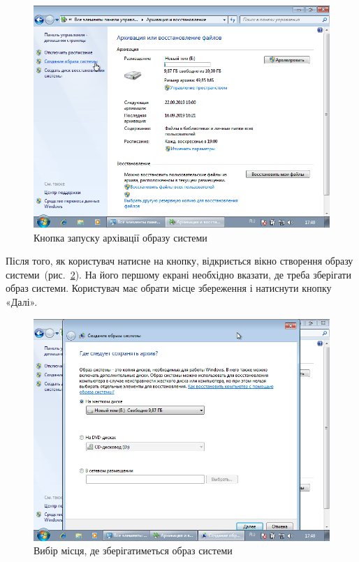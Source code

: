 \documentclass[
	a4paper,
	oneside,
	BCOR = 10mm,
	DIV = 12,
	12pt,
	headings = normal,
]{scrartcl}
\begin{document}
				\begin{figure}[!htbp]
					\centering
					\includegraphics[height=11\baselineskip]{./assets/y04s01-infosec-lab-01-03-p07.png}
					\caption{Кнопка запуску архівації образу системи}
					\label{fig:02-system-img-01}
				\end{figure}

				Після того, як користувач натисне на кнопку, відкриється вікно створення образу системи~(рис.~\ref{fig:02-system-img-02}). На його першому екрані необхідно вказати, де треба зберігати образ системи. Користувач має обрати місце збереження і натиснути кнопку «Далі».

				\begin{figure}[!htbp]
					\centering
					\includegraphics[height=12\baselineskip]{./assets/y04s01-infosec-lab-01-03-p08.png}
					\caption{Вибір місця, де зберігатиметься образ системи}
					\label{fig:02-system-img-02}
				\end{figure}
\end{document}
